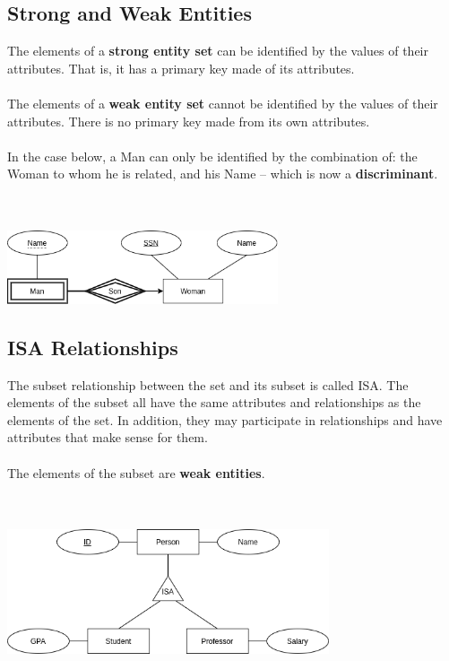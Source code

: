 \documentclass{article}
\begin{document}
\subsection{Strong and Weak Entities}
The elements of a \textbf{strong entity set} can be identified by the values of their attributes. That is, it has a primary key made of its attributes. \\ \\
The elements of a \textbf{weak entity set} cannot be identified by the values of their attributes. There is no primary key made from its own attributes. \\ \\
In the case below, a Man can only be identified by the combination of: the Woman to whom he is related, and his Name -- which is now a \textbf{discriminant}. \\ \\ \\

\centerline{\includegraphics[width=8cm]{./assets/weak.png}}
\vspace{.6cm}

\subsection{ISA Relationships}
The subset relationship between the set and its subset is called ISA. The elements of the subset all have the same attributes and relationships as the elements of the set. In addition, they may participate in relationships and have attributes that make sense for them. \\ \\
The elements of the subset are \textbf{weak entities}. \\ \\ \\

\centerline{\includegraphics[width=9.5cm]{./assets/isa.png}}
\vspace{.6cm}
\end{document}
